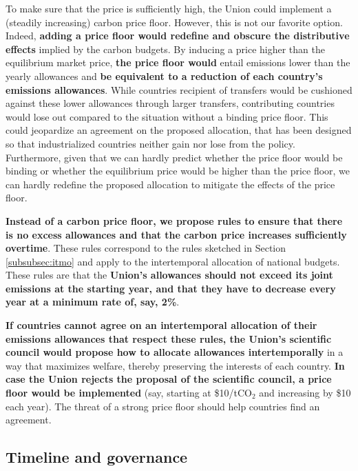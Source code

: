 \documentclass[12pt,english]{article}
\begin{document}
To make sure that the price is sufficiently high, the Union could implement a (steadily increasing) carbon price floor. However, this is not our favorite option. Indeed, \textbf{adding a price floor would redefine and obscure the distributive effects} implied by the carbon budgets. By inducing a price higher than the equilibrium market price, \textbf{the price floor would} entail emissions lower than the yearly allowances and \textbf{be equivalent to a reduction of each country's emissions allowances}. While countries recipient of transfers would be cushioned against these lower allowances through larger transfers, contributing countries would lose out compared to the situation without a binding price floor. This could jeopardize an agreement on the proposed allocation, that has been designed so that industrialized countries neither gain nor lose from the policy. Furthermore, given that we can hardly predict whether the price floor would be binding or whether the equilibrium price would be higher than the price floor, we can hardly redefine the proposed allocation to mitigate the effects of the price floor.

\textbf{Instead of a carbon price floor, we propose rules to ensure that there is no excess allowances and that the carbon price increases sufficiently overtime}. These rules correspond to the rules sketched in Section \ref{subsubsec:itmo} and apply to the intertemporal allocation of national budgets. These rules are that the \textbf{Union's allowances should not exceed its joint emissions at the starting year, and that they have to decrease every year at a minimum rate of, say, 2\%}. 

\textbf{If countries cannot agree on an intertemporal allocation of their emissions allowances that respect these rules, the Union's scientific council would propose how to allocate allowances intertemporally} in a way that maximizes welfare, thereby preserving the interests of each country. \textbf{In case the Union rejects the proposal of the scientific council, a price floor would be implemented} (say, starting at \$10/tCO$_\text{2}$ and increasing by \$10 each year). The threat of a strong price floor should help countries find an agreement.

\subsection{Timeline and governance\label{subsec:implementation}}

\end{document}
